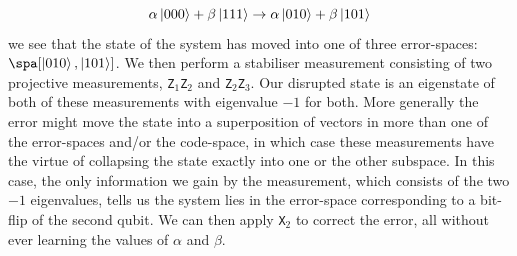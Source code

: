 \documentclass{report}
\begin{document}
\begin{equation}
    \alpha\ket{0 0 0} + \beta\ket{1 1 1} \rightarrow \alpha\ket{0 1 0} + \beta\ket{1 0 1}
\end{equation}
we see that the state of the system has moved into one of three error-spaces: $\spa[\ket{0 1 0}, \ket{1 0 1}]$. We then perform a stabiliser measurement consisting of two projective measurements, \texttt{Z$_1$Z$_2$} and \texttt{Z$_2$Z$_3$}. Our disrupted state is an eigenstate of both of these measurements with eigenvalue $-1$ for both. More generally the error might move the state into a superposition of vectors in more than one of the error-spaces and/or the code-space, in which case these measurements have the virtue of collapsing the state exactly into one or the other subspace. In this case, the only information we gain by the measurement, which consists of the two $-1$ eigenvalues, tells us the system lies in the error-space corresponding to a bit-flip of the second qubit. We can then apply \texttt{X$_2$} to correct the error, all without ever learning the values of $\alpha$ and $\beta$. 
\end{document}
